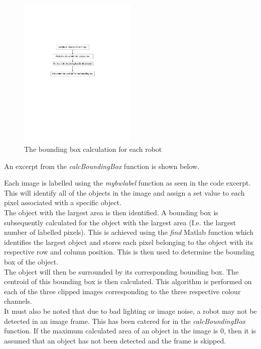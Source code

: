 \documentclass{article}
\begin{document}
\begin{figure}[h!] 
  \centering
    \includegraphics[width=0.5\textwidth]{../Drawings/boundingbox.pdf}
    \caption{The bounding box calculation for each robot }
    \label{fig:bounding}
\end{figure}

An excerpt from the \textit{calcBoundingBox} function is shown below.



Each image is labelled using the \textit{mybwlabel} function as seen in the code excerpt. This will identify all of the objects in the image and assign a set value to each pixel associated with a specific object.  \\

The object with the largest area is then identified. A bounding box is subsequently calculated for the object with the largest area (I.e. the largest number of labelled pixels). This is achieved using the \textit{find} Matlab function which identifies the largest object and stores each pixel belonging to the object with its respective row and column position. This is then used to determine the bounding box of the object.\\

The object will then be surrounded by its corresponding bounding box. The centroid of this bounding box is then calculated. This algorithm is performed on each of the three clipped images corresponding to the three respective colour channels.\\

It must also be noted that due to bad lighting or image noise, a robot may not be detected in an image frame. This has been catered for in the \textit{calcBoundingBox} function. If the maximum calculated area of an object in the image is $0$, then it is assumed that an object has not been detected and the frame is skipped.
\end{document}

